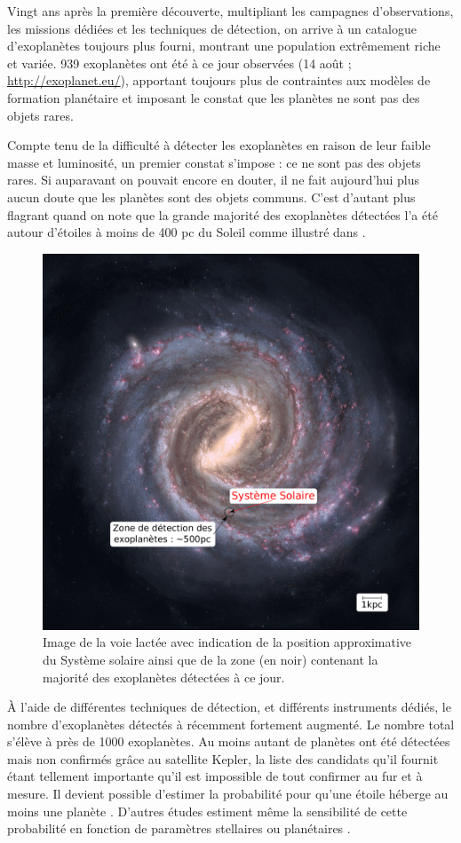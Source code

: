 Vingt ans après la première découverte, multipliant les campagnes d'observations, les missions dédiées et les techniques
de détection, on arrive à un catalogue d'exoplanètes toujours plus fourni, montrant une
population extrêmement riche et variée. 939 exoplanètes ont été à ce jour observées (14 août ; \url{http://exoplanet.eu/}),
apportant toujours plus de contraintes aux modèles de formation planétaire et imposant le constat que les planètes ne sont pas des objets rares. 

Compte tenu de la difficulté à détecter les exoplanètes en raison de leur faible masse et luminosité, un premier constat
s'impose : ce ne sont pas des objets rares. Si auparavant on pouvait encore en douter, il ne fait aujourd'hui plus aucun doute
que les planètes sont des objets communs. C'est d'autant plus flagrant quand on note que la grande majorité des exoplanètes
détectées l'a été autour d'étoiles à moins de 400 pc du Soleil comme illustré dans . 

\begin{figure}[htbp]
\centering
\includegraphics[width=0.45\linewidth]{figure/milky_way_exoplanets.pdf}
\caption[Sphère de détection des exoplanètes par rapport à la Voie Lactée]{Image de la voie lactée avec indication de la
position approximative du Système solaire ainsi que de la zone (en noir) contenant la majorité des exoplanètes détectées à ce
jour.}\label{fig:milky_way_exoplanet}
\end{figure}

À l'aide de différentes techniques de détection, et différents instruments dédiés, le nombre d'exoplanètes détectés à récemment fortement augmenté. Le nombre total s'élève à près de 1000 exoplanètes. Au moins autant de planètes ont été détectées mais non confirmés grâce au satellite Kepler, la liste des candidats qu'il fournit étant tellement importante qu'il est impossible de tout confirmer au fur et à mesure. Il devient
possible d'estimer la probabilité pour qu'une étoile héberge au moins une planète \citep{mayor2011road}. D'autres études
estiment même la sensibilité de cette probabilité en fonction de paramètres stellaires \citep{fischer2005planet,
johnson2007new, howard2012occurrence} ou planétaires \citep{mayor2011road, howard2010occurrence}. 

